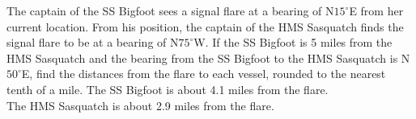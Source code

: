 { The captain of the SS Bigfoot sees a signal flare at a bearing of N$15^{\circ}$E from her current location. From his position, the captain of the HMS Sasquatch finds the signal flare to be at a bearing of N$75^{\circ}$W.  If the SS Bigfoot is 5 miles from the HMS Sasquatch and the bearing from the SS Bigfoot to the HMS Sasquatch is N$50^{\circ}$E, find the distances from the flare to each vessel, rounded to the nearest tenth of a mile.}
{The SS Bigfoot is about 4.1 miles from the flare. \\The HMS Sasquatch is about 2.9 miles from the flare.}
